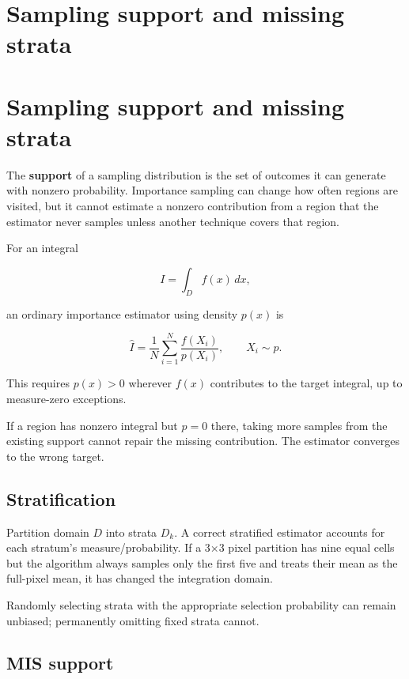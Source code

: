 \hypertarget{appendix-10308c3d753e}{}
\section*{Sampling support and missing strata}
\section{Sampling support and missing strata}\label{appendix-10308c3d753e-sampling-support-and-missing-strata}

The \textbf{support} of a sampling distribution is the set of outcomes it can generate with nonzero probability. Importance sampling can change how often regions are visited, but it cannot estimate a nonzero contribution from a region that the estimator never samples unless another technique covers that region.

For an integral

\[
I=\int_D f(x)\,dx,
\]

an ordinary importance estimator using density \(p(x)\) is

\[
\hat I=\frac1N\sum_{i=1}^N\frac{f(X_i)}{p(X_i)},
\qquad X_i\sim p.
\]

This requires \(p(x)>0\) wherever \(f(x)\) contributes to the target integral, up to measure-zero exceptions.

If a region has nonzero integral but \(p=0\) there, taking more samples from the existing support cannot repair the missing contribution. The estimator converges to the wrong target.

\subsection{Stratification}\label{appendix-10308c3d753e-stratification}

Partition domain \(D\) into strata \(D_k\). A correct stratified estimator accounts for each stratum's measure/probability. If a 3×3 pixel partition has nine equal cells but the algorithm always samples only the first five and treats their mean as the full-pixel mean, it has changed the integration domain.

Randomly selecting strata with the appropriate selection probability can remain unbiased; permanently omitting fixed strata cannot.

\subsection{MIS support}\label{appendix-10308c3d753e-mis-support}

